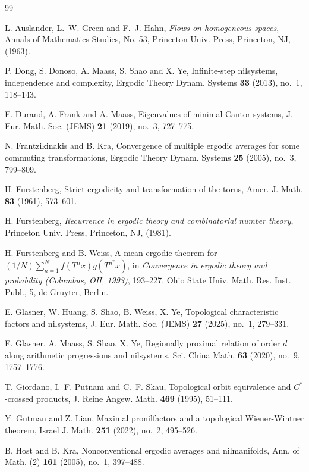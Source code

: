 \documentclass[12pt]{amsart}
\theoremstyle{definition}
\theoremstyle{plain}
\theoremstyle{definition}
\numberwithin{equation}{section}
\begin{document}
 \begin{thebibliography}{99}

 L. Auslander, L.~W. Green and F.~J. Hahn, {\it Flows on homogeneous spaces}, Annals of Mathematics Studies, No. 53, Princeton Univ. Press, Princeton, NJ, (1963).

   P. Dong, S. Donoso, A. Maass, S. Shao and X. Ye, Infinite-step nilsystems, independence and complexity, Ergodic Theory Dynam. Systems {\textbf{33}} (2013), no.~1, 118--143.

 F. Durand, A. Frank and A. Maass, Eigenvalues of minimal Cantor systems, J. Eur. Math. Soc. (JEMS) \textbf{21} (2019), no.~3, 727--775.

N. Frantzikinakis and B. Kra, Convergence of multiple ergodic averages for some commuting transformations, Ergodic Theory Dynam. Systems {\bf 25} (2005), no.~3, 799--809.

H. Furstenberg, Strict ergodicity and transformation of the torus, Amer. J. Math. {\bf 83} (1961), 573--601.


H. Furstenberg, {\it Recurrence in ergodic theory and combinatorial number theory}, Princeton Univ. Press, Princeton, NJ, (1981).

H. Furstenberg and B. Weiss, A mean ergodic theorem for $(1/N)\sum^N_{n=1}f(T^nx)g(T^{n^2}x)$, in {\it Convergence in ergodic theory and probability (Columbus, OH, 1993)}, 193--227, Ohio State Univ. Math. Res. Inst. Publ., 5, de Gruyter, Berlin.

E. Glasner, W. Huang, S. Shao, B. Weiss, X. Ye, Topological characteristic factors and nilsystems, J. Eur. Math. Soc. (JEMS) {\bf 27} (2025), no.~1, 279--331.

 E. Glasner, A. Maass, S. Shao, X. Ye, Regionally proximal relation of order $d$ along arithmetic progressions and nilsystems, Sci. China Math. {\bf 63} (2020), no.~9, 1757--1776.

 T. Giordano, I.~F. Putnam and C.~F. Skau, Topological orbit equivalence and $C^*$-crossed products, J. Reine Angew. Math. {\bf 469} (1995), 51--111.

  Y. Gutman and Z. Lian, Maximal pronilfactors and a topological Wiener-Wintner theorem, Israel J. Math. {\bf 251} (2022), no.~2, 495--526.

 B. Host and B. Kra, Nonconventional ergodic averages and nilmanifolds, Ann. of Math. (2) {\textbf {161}} (2005), no.~1, 397--488.


\end{thebibliography}
\end{document}
